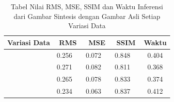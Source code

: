 \begin{table}[]
  \caption{Tabel Nilai RMS, MSE, SSIM dan Waktu Inferensi dari Gambar Sintesis dengan Gambar Asli Setiap Variasi Data}
  \label{tb:evaluasimatriks}
  \begin{tabular}{|l|cc|cc|cc|c|}
  \hline
  \multicolumn{1}{|c|}{Variasi Data}                  & \multicolumn{2}{c|}{RMS}                                                                              & \multicolumn{2}{c|}{MSE}                                                                                & \multicolumn{2}{c|}{SSIM}                                                                            & \multicolumn{1}{c|}{Waktu}                            \\ \hline
                                                      & \multicolumn{1}{c|}{\cellcolor[HTML]{FFFFFF}0.256} & \cellcolor[HTML]{FFFFFF}                         & \multicolumn{1}{c|}{\cellcolor[HTML]{FFFFFF}0.072} & \cellcolor[HTML]{FFFFFF}                           & \multicolumn{1}{c|}{\cellcolor[HTML]{FFFFFF}0.848} & \cellcolor[HTML]{FFFFFF}                        & \multicolumn{1}{c|}{\cellcolor[HTML]{FFFFFF}0.404}   \\ \cline{2-2} \cline{4-4} \cline{6-6}
                                                      & \multicolumn{1}{c|}{\cellcolor[HTML]{FFFFFF}0.271} & \cellcolor[HTML]{FFFFFF}                         & \multicolumn{1}{c|}{\cellcolor[HTML]{FFFFFF}0.082} & \cellcolor[HTML]{FFFFFF}                           & \multicolumn{1}{c|}{\cellcolor[HTML]{FFFFFF}0.811} & \cellcolor[HTML]{FFFFFF}                        & \multicolumn{1}{c|}{\cellcolor[HTML]{FFFFFF}0.368}   \\ \cline{2-2} \cline{4-4} \cline{6-6}
                                                      & \multicolumn{1}{c|}{\cellcolor[HTML]{FFFFFF}0.265} & \cellcolor[HTML]{FFFFFF}                         & \multicolumn{1}{c|}{\cellcolor[HTML]{FFFFFF}0.078} & \cellcolor[HTML]{FFFFFF}                           & \multicolumn{1}{c|}{\cellcolor[HTML]{FFFFFF}0.833} & \cellcolor[HTML]{FFFFFF}                        & \multicolumn{1}{c|}{\cellcolor[HTML]{FFFFFF}0.374}   \\ \cline{2-2} \cline{4-4} \cline{6-6}
                                                      & \multicolumn{1}{c|}{\cellcolor[HTML]{FFFFFF}0.234} & \cellcolor[HTML]{FFFFFF}                         & \multicolumn{1}{c|}{\cellcolor[HTML]{FFFFFF}0.063} & \cellcolor[HTML]{FFFFFF}                           & \multicolumn{1}{c|}{\cellcolor[HTML]{FFFFFF}0.837} & \cellcolor[HTML]{FFFFFF}                        & \multicolumn{1}{c|}{\cellcolor[HTML]{FFFFFF}0.412}   \\ \cline{2-2} \cline{4-4} \cline{6-6}

\end{tabular}
\end{table}

